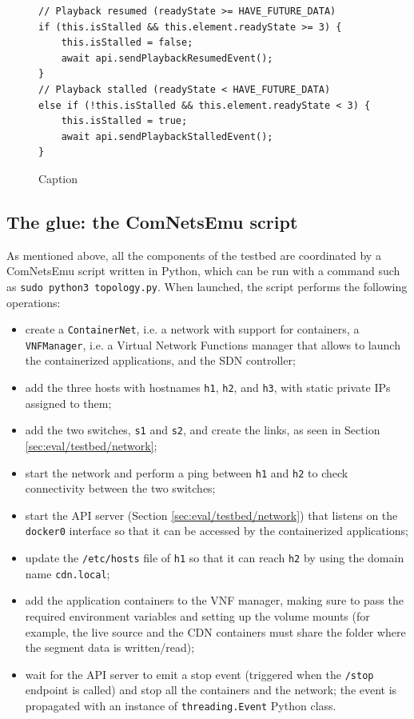\begin{figure}
    \centering
    \begin{verbatim}
// Playback resumed (readyState >= HAVE_FUTURE_DATA)
if (this.isStalled && this.element.readyState >= 3) {
    this.isStalled = false;
    await api.sendPlaybackResumedEvent();
}
// Playback stalled (readyState < HAVE_FUTURE_DATA)
else if (!this.isStalled && this.element.readyState < 3) {
    this.isStalled = true;
    await api.sendPlaybackStalledEvent();
}
    \end{verbatim}
    \caption{Caption}
    \label{fig:hls_readystate}
\end{figure}

\subsection{The glue: the ComNetsEmu script}
\label{sec:eval/testbed/script}

As mentioned above, all the components of the testbed are coordinated by a ComNetsEmu script written in Python, which can be run with a command such as \texttt{sudo python3 topology.py}. When launched, the script performs the following operations:

\begin{itemize}
    \item create a \texttt{ContainerNet}, i.e. a network with support for containers, a \texttt{VNFManager}, i.e. a Virtual Network Functions manager that allows to launch the containerized applications, and the SDN controller;
    \item add the three hosts with hostnames \texttt{h1}, \texttt{h2}, and \texttt{h3}, with static private IPs assigned to them;
    \item add the two switches, \texttt{s1} and \texttt{s2}, and create the links, as seen in Section \ref{sec:eval/testbed/network};
    \item start the network and perform a ping between \texttt{h1} and \texttt{h2} to check connectivity between the two switches;
    \item start the API server (Section \ref{sec:eval/testbed/network}) that listens on the \texttt{docker0} interface so that it can be accessed by the containerized applications;
    \item update the \texttt{/etc/hosts} file of \texttt{h1} so that it can reach \texttt{h2} by using the domain name \texttt{cdn.local};
    \item add the application containers to the VNF manager, making sure to pass the required environment variables and setting up the volume mounts (for example, the live source and the CDN containers must share the folder where the segment data is written/read);
    \item wait for the API server to emit a stop event (triggered when the \texttt{/stop} endpoint is called) and stop all the containers and the network; the event is propagated with an instance of \texttt{threading.Event} Python class.
\end{itemize}

